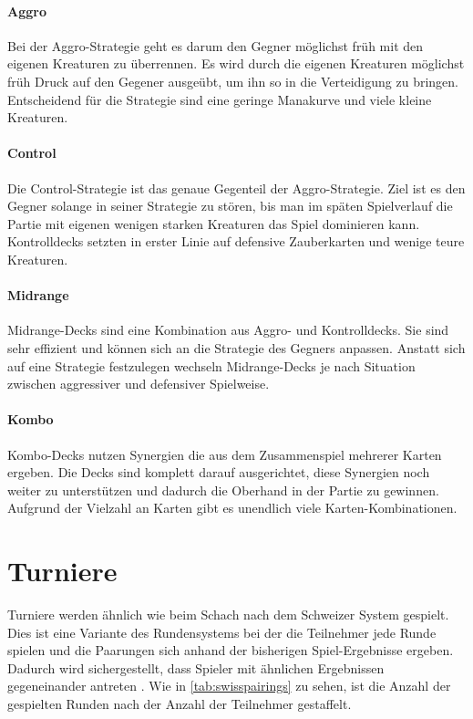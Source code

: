 \paragraph{Aggro}
Bei der Aggro-Strategie geht es darum den Gegner möglichst früh mit den eigenen Kreaturen zu überrennen. Es wird durch die eigenen Kreaturen möglichst früh Druck auf den Gegener ausgeübt, um ihn so in die Verteidigung zu bringen. Entscheidend für die Strategie sind eine geringe Manakurve und viele kleine Kreaturen. \cite{wotc:gameplay}

\paragraph{Control}
Die Control-Strategie ist das genaue Gegenteil der Aggro-Strategie. Ziel ist es den Gegner solange in seiner Strategie zu stören, bis man im späten Spielverlauf die Partie mit eigenen wenigen starken Kreaturen das Spiel dominieren kann. Kontrolldecks setzten in erster Linie auf defensive Zauberkarten und wenige teure Kreaturen. \cite{wotc:gameplay}

\paragraph{Midrange}
Midrange-Decks sind eine Kombination aus Aggro- und Kontrolldecks. Sie sind sehr effizient und können sich an die Strategie des Gegners anpassen. Anstatt sich auf eine Strategie festzulegen wechseln Midrange-Decks je nach Situation zwischen aggressiver und defensiver Spielweise. \cite{wotc:gameplay}

\paragraph{Kombo}
Kombo-Decks nutzen Synergien die aus dem Zusammenspiel mehrerer Karten ergeben. Die Decks sind komplett darauf ausgerichtet, diese Synergien noch weiter zu unterstützen und dadurch die Oberhand in der Partie zu gewinnen. Aufgrund der Vielzahl an Karten gibt es unendlich viele Karten-Kombinationen. \cite{wotc:gameplay}


\section{Turniere}
Turniere werden ähnlich wie beim Schach nach dem Schweizer System gespielt. Dies ist eine Variante des Rundensystems bei der die Teilnehmer jede Runde spielen und die Paarungen sich anhand der bisherigen Spiel-Ergebnisse ergeben. Dadurch wird sichergestellt, dass Spieler mit ähnlichen Ergebnissen gegeneinander antreten \cite{starcitygames:swiss}. Wie in \autoref{tab:swisspairings} zu sehen, ist die Anzahl der gespielten Runden nach der Anzahl der Teilnehmer gestaffelt. 

